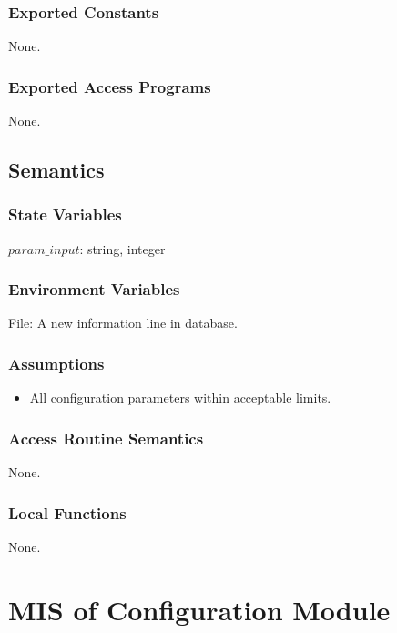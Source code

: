 \documentclass[12pt, titlepage]{article}
\begin{document}
\subsubsection{Exported Constants}

None.

\subsubsection{Exported Access Programs}

None.

\subsection{Semantics}

\subsubsection{State Variables}

$param\_input$: string, integer

\subsubsection{Environment Variables}

File: A new information line in database.

\subsubsection{Assumptions}

\begin{itemize}
\item All configuration parameters within acceptable limits.
\end{itemize}

\subsubsection{Access Routine Semantics}

None.

\subsubsection{Local Functions}

None.

\newpage

\section{MIS of Configuration Module} \label{mPS2} 
\end{document}
